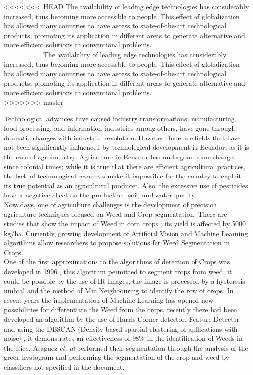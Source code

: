 \documentclass[conference]{IEEEtran}
\begin{document}
<<<<<<< HEAD
The availability of leading edge technologies  has considerably increased, thus becoming more accessible to people. This effect of globalization has allowed many countries to have access to state-of-the-art technological products, promoting its application in different areas to generate alternative and more efficient solutions to conventional problems. 
\\
=======
The availability of leading edge technologies  has considerably increased, thus becoming more accessible to people. This effect of globalization has allowed many countries to have access to state-of-the-art technological products, promoting its application in different areas to generate alternative and more efficient solutions to conventional problems. \\
>>>>>>> master

Technological advances have caused industry transformations; manufacturing, food processing, and information industries among others, have gone through dramatic changes with industrial revolution. However there are fields that have not been significantly influenced by technological development in Ecuador, as it is the case of agroindustry. Agriculture in Ecuador has undergone some changes since colonial times; while it is true that there are efficient agricultural practices, the lack of technological resources make it impossible for the country to exploit its true potential as an agricultural producer. Also, the excessive use of pesticides have a negative effect on the production, soil, and water quality. 
\\

Nowadays, one of agriculture challenges is the development of precision agriculture techniques focused on Weed and Crop segmentation. There are studies that show the impact of Weed in corn crops \cite{suarez2005distintos}; its yield is affected by 5000 kg/ha. Currently, growing development of Artificial Vision and Machine Learning algorithms allow researchers to propose solutions for Weed Segmentation in Crops. 
\\

One of the first approximations to the algorithms of detection of Crops was  developed in 1996 \cite{brivot1996segmentation}, this algorithm permitted to segment crops from weed, it could be possible by the use of IR Images, the image is processed by a hysteresis umbral and the method of Min Neighbouring to identify the row of crops. In recent years the implementation of Machine Learning has opened new possibilities for differentiate the Weed from the crops, recently \cite{cheng2015feature} there had been developed an algorithm by the use of Harris Corner detector, Feature Detector and using the DBSCAN (Density-based spartial clustering of apllications with noise) , it demonstrates an effectiveness of  98\% in the identification of Weeds in the Rice, Araguez \textit{et. al} \cite{equipo2006proceedings}  performed their segmentation through the analysis of the green hystogram and performing the segmentation of the crop and weed by classifiers not specified in the document. 
\\
\end{document}
